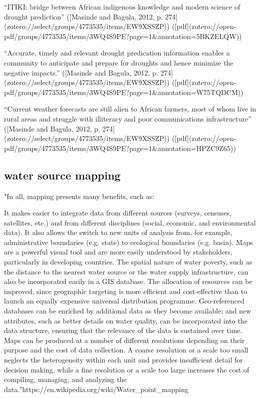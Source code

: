 {“ITIKI: bridge between African indigenous knowledge and modern science of drought prediction” ([Masinde and Bagula, 2012, p. 274](zotero://select/groups/4773535/items/EW9XSSZP)) ([pdf](zotero://open-pdf/groups/4773535/items/3WQ4S9PE?page=1&annotation=5BKZELQW))

“Accurate, timely and relevant drought predication information enables a community to anticipate and prepare for droughts and hence minimize the negative impacts.” ([Masinde and Bagula, 2012, p. 274](zotero://select/groups/4773535/items/EW9XSSZP)) ([pdf](zotero://open-pdf/groups/4773535/items/3WQ4S9PE?page=1&annotation=W75TQDCM))

“Current weather forecasts are still alien to African farmers, most of whom live in rural areas and struggle with illiteracy and poor communications infrastructure” ([Masinde and Bagula, 2012, p. 274](zotero://select/groups/4773535/items/EW9XSSZP)) ([pdf](zotero://open-pdf/groups/4773535/items/3WQ4S9PE?page=1&annotation=HPZC9Z65))


\subsection{water source mapping}
"In all, mapping presents many benefits, such as:

It makes easier to integrate data from different sources (surveys, censuses, satellites, etc.) and from different disciplines (social, economic, and environmental data). It also allows the switch to new units of analysis from, for example, administrative boundaries (e.g. state) to ecological boundaries (e.g. basin).
Maps are a powerful visual tool and are more easily understood by stakeholders, particularly in developing countries.
The spatial nature of water poverty, such as the distance to the nearest water source or the water supply infrastructure, can also be incorporated easily in a GIS database.
The allocation of resources can be improved, since geographic targeting is more efficient and cost-effective than to launch an equally expensive universal distribution programme.
Geo-referenced databases can be enriched by additional data as they become available; and new attributes, such as better details on water quality, can be incorporated into the data structure, ensuring that the relevance of the data is sustained over time.
Maps can be produced at a number of different resolutions depending on their purpose and the cost of data collection. A coarse resolution or a scale too small neglects the heterogeneity within each unit and provides insufficient detail for decision making, while a fine resolution or a scale too large increases the cost of compiling, managing, and analyzing the data."https://en.wikipedia.org/wiki/Water_point_mapping

}
